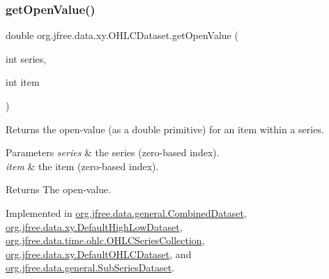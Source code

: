 \subsubsection{\texorpdfstring{get\+Open\+Value()}{getOpenValue()}}
{\footnotesize\ttfamily double org.\+jfree.\+data.\+xy.\+O\+H\+L\+C\+Dataset.\+get\+Open\+Value (\begin{DoxyParamCaption}\item[{int}]{series,  }\item[{int}]{item }\end{DoxyParamCaption})}

Returns the open-\/value (as a double primitive) for an item within a series.


\begin{DoxyParams}{Parameters}
{\em series} & the series (zero-\/based index). \\
\hline
{\em item} & the item (zero-\/based index).\\
\hline
\end{DoxyParams}
\begin{DoxyReturn}{Returns}
The open-\/value. 
\end{DoxyReturn}


Implemented in \mbox{\hyperlink{classorg_1_1jfree_1_1data_1_1general_1_1_combined_dataset_a6f455c326e5f591bc1ef4b90b7bb4499}{org.\+jfree.\+data.\+general.\+Combined\+Dataset}}, \mbox{\hyperlink{classorg_1_1jfree_1_1data_1_1xy_1_1_default_high_low_dataset_abff3ec5a5c09adb6bf28255be06e3fab}{org.\+jfree.\+data.\+xy.\+Default\+High\+Low\+Dataset}}, \mbox{\hyperlink{classorg_1_1jfree_1_1data_1_1time_1_1ohlc_1_1_o_h_l_c_series_collection_a3184febfa7139d57a1821c4d24d59360}{org.\+jfree.\+data.\+time.\+ohlc.\+O\+H\+L\+C\+Series\+Collection}}, \mbox{\hyperlink{classorg_1_1jfree_1_1data_1_1xy_1_1_default_o_h_l_c_dataset_aa27c323e713453b49bad22eecd6597e2}{org.\+jfree.\+data.\+xy.\+Default\+O\+H\+L\+C\+Dataset}}, and \mbox{\hyperlink{classorg_1_1jfree_1_1data_1_1general_1_1_sub_series_dataset_a90452500367ee5658b035fb0e563fe0c}{org.\+jfree.\+data.\+general.\+Sub\+Series\+Dataset}}.

\mbox{\label{interfaceorg_1_1jfree_1_1data_1_1xy_1_1_o_h_l_c_dataset_a05012f783f010c1a62873a0c40e7b7fa}} 
